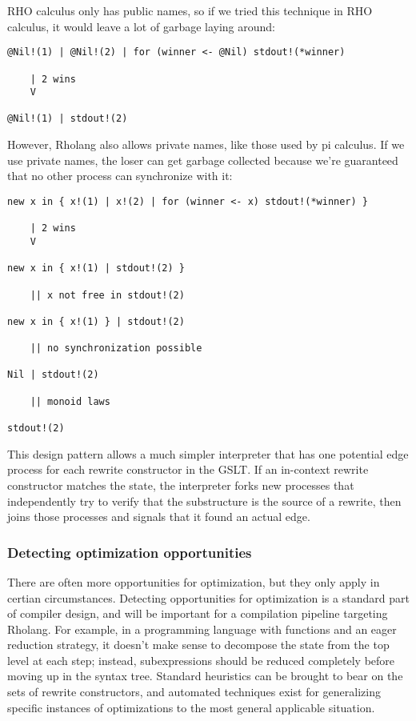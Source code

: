 \documentclass{article}
\begin{document}
RHO calculus only has public names, so if we tried this technique in RHO calculus, it would leave a lot of garbage laying around:

\begin{verbatim}
@Nil!(1) | @Nil!(2) | for (winner <- @Nil) stdout!(*winner)

    | 2 wins
    V

@Nil!(1) | stdout!(2)
\end{verbatim}

\noindent However, Rholang also allows private names, like those used by pi calculus.  If we use private names, the loser can get garbage collected because we're guaranteed that no other process can synchronize with it:

\begin{verbatim}
new x in { x!(1) | x!(2) | for (winner <- x) stdout!(*winner) }

    | 2 wins
    V

new x in { x!(1) | stdout!(2) }

    || x not free in stdout!(2)

new x in { x!(1) } | stdout!(2)

    || no synchronization possible

Nil | stdout!(2)

    || monoid laws

stdout!(2)
\end{verbatim}

This design pattern allows a much simpler interpreter that has one potential edge process for each rewrite constructor in the GSLT.  If an in-context rewrite constructor matches the state, the interpreter forks new processes that independently try to verify that the substructure is the source of a rewrite, then joins those processes and signals that it found an actual edge.

\subsubsection{Detecting optimization opportunities}

There are often more opportunities for optimization, but they only apply in certian circumstances.  Detecting opportunities for optimization is a standard part of compiler design, and will be important for a compilation pipeline targeting Rholang.  For example, in a programming language with functions and an eager reduction strategy, it doesn't make sense to decompose the state from the top level at each step; instead, subexpressions should be reduced completely before moving up in the syntax tree.  Standard heuristics can be brought to bear on the sets of rewrite constructors, and automated techniques exist for generalizing specific instances of optimizations to the most general applicable situation.
\end{document}
